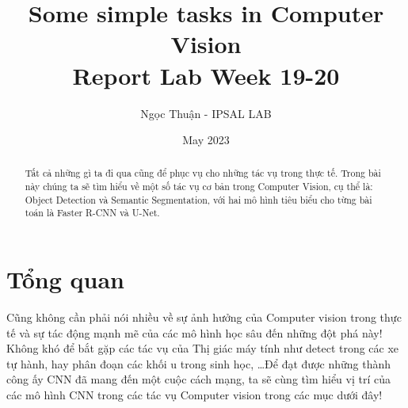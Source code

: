 \documentclass{article}
\title{Some simple tasks in Computer Vision \\ \Large Report Lab Week 19-20}
\author{Ngọc Thuận - IPSAL LAB}
\date{May 2023}
\begin{document}
\maketitle
\begin{abstract}
    Tất cả những gì ta đi qua cũng để phục vụ cho những tác vụ trong thực tế. Trong bài này chúng ta sẽ tìm hiểu về một số tác vụ cơ bản trong Computer Vision, cụ thể là: Object Detection và Semantic Segmentation, với hai mô hình tiêu biểu cho từng bài toán là Faster R-CNN và U-Net.
\end{abstract}
\tableofcontents
\newpage

\section{Tổng quan}
Cũng không cần phải nói nhiều về sự ảnh hưởng của Computer vision trong thực tế và sự tác động mạnh mẽ của các mô hình học sâu đến những đột phá này! Không khó để bắt gặp các tác vụ của Thị giác máy tính như detect trong các xe tự hành, hay phân đoạn các khối u trong sinh học, \ldots Để đạt được những thành công ấy CNN đã mang đến một cuộc cách mạng, ta sẽ cùng tìm hiểu vị trí của các mô hình CNN trong các tác vụ Computer vision trong các mục dưới đây! 
\end{document}

